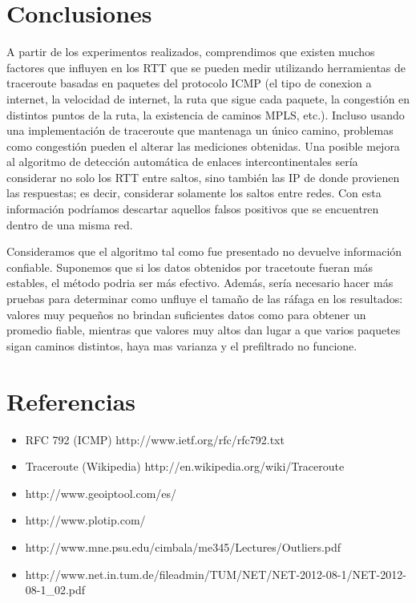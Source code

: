 \section{Conclusiones}

	A partir de los experimentos realizados, comprendimos que existen muchos factores que influyen en los RTT que se pueden medir utilizando herramientas de traceroute basadas en paquetes del protocolo ICMP (el tipo de conexion a internet, la velocidad de internet, la ruta que sigue cada paquete, la congestión en distintos puntos de la ruta, la existencia de caminos MPLS, etc.).
	Incluso usando una implementación de traceroute que mantenaga un único camino, problemas como congestión pueden el alterar las mediciones obtenidas.
	Una posible mejora al algoritmo de detección automática de enlaces intercontinentales sería considerar no solo los RTT entre saltos, sino también las IP de donde provienen las respuestas; es decir, considerar solamente los saltos entre redes. Con esta información podríamos descartar aquellos falsos positivos que se encuentren dentro de una misma red. 
	
	Consideramos que el algoritmo tal como fue presentado no devuelve información confiable. Suponemos que si los datos obtenidos por tracetoute fueran más estables, el método podria ser más efectivo. Además, sería necesario hacer más pruebas para determinar como unfluye el tamaño de las ráfaga en los resultados: valores muy pequeños no brindan suficientes datos como para obtener un promedio fiable, mientras que valores muy altos dan lugar a que varios paquetes sigan caminos distintos, haya mas varianza y el prefiltrado no funcione.

\section{Referencias}
\begin{itemize}
 \item RFC 792 (ICMP) http://www.ietf.org/rfc/rfc792.txt
 \item Traceroute (Wikipedia) http://en.wikipedia.org/wiki/Traceroute
 \item http://www.geoiptool.com/es/
 \item http://www.plotip.com/
 \item http://www.mne.psu.edu/cimbala/me345/Lectures/Outliers.pdf
 \item http://www.net.in.tum.de/fileadmin/TUM/NET/NET-2012-08-1/NET-2012-08-1\_02.pdf
 
\end{itemize}
